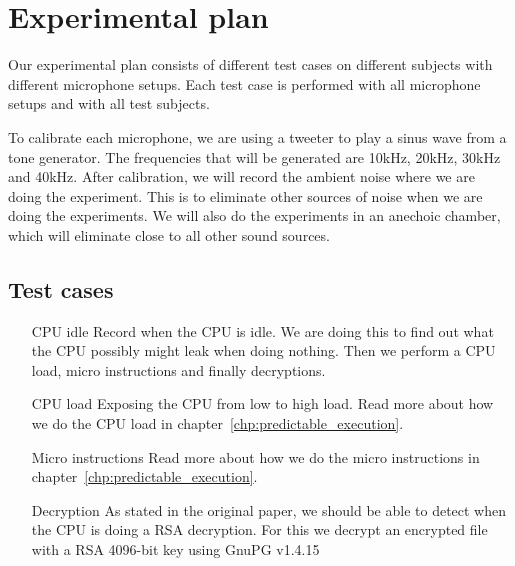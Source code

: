 

\section{Experimental plan}\label{sec:ch3_experimental_plan}

Our experimental plan consists of different test cases on different subjects with different microphone setups. 
Each test case is performed with all microphone setups and with all test subjects. 

To calibrate each microphone, we are using a tweeter to play a sinus wave from a tone generator. 
The frequencies that will be generated are 10kHz, 20kHz, 30kHz and 40kHz.
After calibration, we will record the ambient noise where we are doing the experiment.
This is to eliminate other sources of noise when we are doing the experiments.
We will also do the experiments in an anechoic chamber, which will eliminate close to all other sound sources.

\subsection{Test cases}


\begin{enumerate}
  \item[CPU idle] Record when the CPU is idle. 
  We are doing this to find out what the CPU possibly might leak when doing nothing. 
  Then we perform a CPU load, micro instructions and finally decryptions.
  \item[CPU load] Exposing the CPU from low to high load.
  Read more about how we do the CPU load in chapter~\ref{chp:predictable_execution}.
  \item[Micro instructions] Read more about how we do the micro instructions in chapter~\ref{chp:predictable_execution}.
  \item[Decryption] As stated in the original paper, we should be able to detect when the CPU is doing a RSA decryption. 
  For this we decrypt an encrypted file with a RSA 4096-bit key using GnuPG v1.4.15~\cite{GnuPG_1.4.15}
\end{enumerate}

